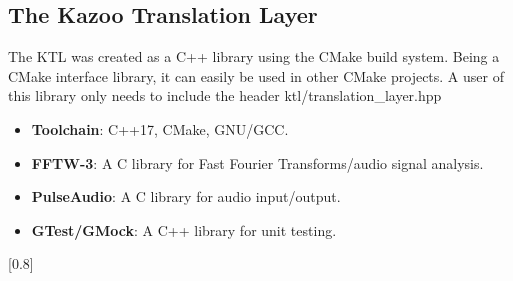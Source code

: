 \documentclass[]{article}
\begin{document}
\subsection{The Kazoo Translation Layer}

The KTL was created as a C++ library using the CMake build system. Being a CMake interface library, it can easily be used in other CMake projects. A user of this library only needs to include the header ktl/translation\_layer.hpp

\begin{itemize}
  \item \textbf{Toolchain}: C++17, CMake, GNU/GCC.
  \item \textbf{FFTW-3}: A C library for Fast Fourier Transforms/audio signal analysis.
  \item \textbf{PulseAudio}: A C library for audio input/output.
  \item \textbf{GTest/GMock}: A C++ library for unit testing.
\end{itemize}

[0.8\textwidth]
\end{document}
